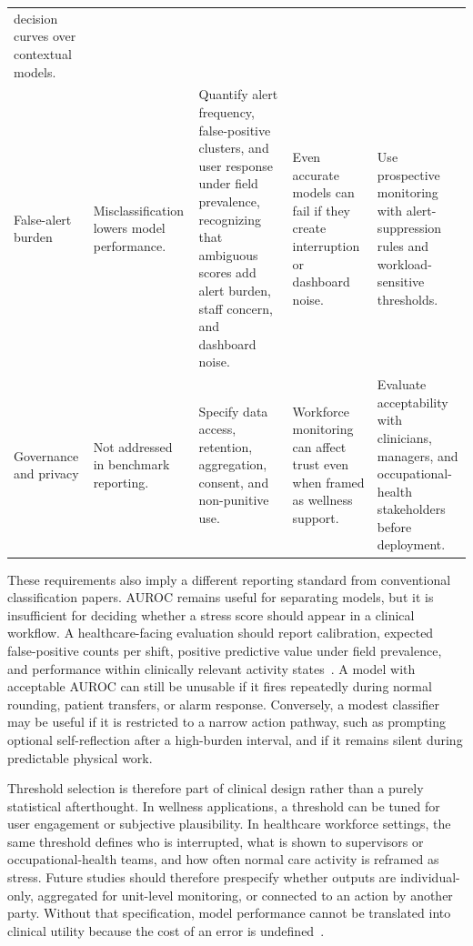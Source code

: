\documentclass[healthcare,article,submit,moreauthors,pdftex]{Definitions/mdpi}
\begin{document}
\begin{table}[H]
\begin{tabular}{@{}L{0.12\textwidth}L{0.17\textwidth}L{0.26\textwidth}L{0.19\textwidth}L{0.19\textwidth}@{}}
decision curves over contextual models. \\
False-alert burden &
Misclassification lowers model performance. &
Quantify alert frequency, false-positive clusters, and user response under field
prevalence, recognizing that ambiguous scores add alert burden, staff concern,
and dashboard noise. &
Even accurate models can fail if they create interruption or dashboard noise. &
Use prospective monitoring with alert-suppression rules and workload-sensitive
thresholds. \\
Governance and privacy &
Not addressed in benchmark reporting. &
Specify data access, retention, aggregation, consent, and non-punitive use. &
Workforce monitoring can affect trust even when framed as wellness support. &
Evaluate acceptability with clinicians, managers, and occupational-health
stakeholders before deployment. \\
\bottomrule
\end{tabular}
\end{table}

These requirements also imply a different reporting standard from conventional
classification papers. AUROC remains useful for separating models, but it is
insufficient for deciding whether a stress score should appear in a clinical
workflow. A healthcare-facing evaluation should report calibration, expected
false-positive counts per shift, positive predictive value under field
prevalence, and performance within clinically relevant activity
states~\cite{vancalster2019calibration,vickers2006decisioncurve}. A model with
acceptable AUROC can still be unusable if it fires repeatedly during normal
rounding, patient transfers, or alarm response. Conversely, a modest classifier
may be useful if it is restricted to a narrow action pathway, such as prompting
optional self-reflection after a high-burden interval, and if it remains silent
during predictable physical work.

Threshold selection is therefore part of clinical design rather than a purely
statistical afterthought. In wellness applications, a threshold can be tuned for
user engagement or subjective plausibility. In healthcare workforce settings,
the same threshold defines who is interrupted, what is shown to supervisors or
occupational-health teams, and how often normal care activity is reframed as
stress. Future studies should therefore prespecify whether outputs are
individual-only, aggregated for unit-level monitoring, or connected to an action
by another party. Without that specification, model performance cannot be
translated into clinical utility because the cost of an error is
undefined~\cite{vickers2006decisioncurve,martinezmartin2021ethical}.
\end{document}
